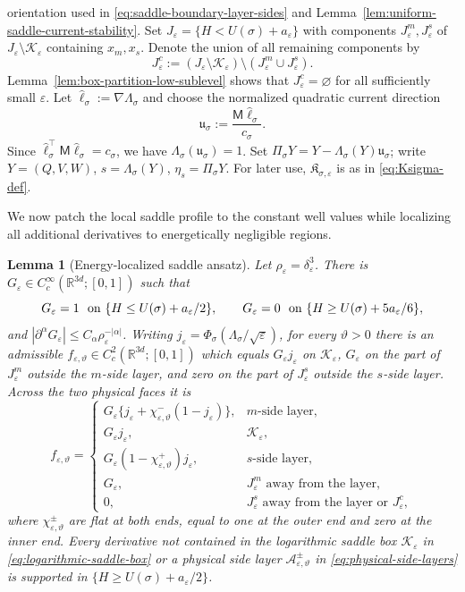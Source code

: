 \documentclass[11pt]{article}
\numberwithin{equation}{section}
\theoremstyle{plain}
\newtheorem{lemma}[theorem]{Lemma}
\theoremstyle{definition}
\theoremstyle{remark}
\newcommand{\R}{\mathbb R}
\newcommand{\eps}{\varepsilon}
\begin{document}
orientation used in \eqref{eq:saddle-boundary-layer-sides} and
Lemma~\ref{lem:uniform-saddle-current-stability}.
Set $J_\eps=\{H<U(\sigma)+a_\eps\}$ with components
$J_\eps^m,J_\eps^s$ of $J_\eps\setminus\mathcal K_\eps$ containing $x_m,x_s$.
Denote the union of all remaining components by
\[
J_\eps^c
:=
\left(J_\eps\setminus\mathcal K_\eps\right)
\setminus\left(J_\eps^m\cup J_\eps^s\right).
\]
Lemma~\ref{lem:box-partition-low-sublevel} shows that
$J_\eps^c=\varnothing$ for all sufficiently small $\eps$.
Let $\widehat\ell_\sigma:=\nabla\Lambda_\sigma$ and choose the normalized quadratic
current direction
\[
\mathfrak u_\sigma:=\frac{\mathsf M\widehat\ell_\sigma}{c_\sigma}.
\]
Since
$\widehat\ell_\sigma^\top\mathsf M\widehat\ell_\sigma=c_\sigma$, we have
$\Lambda_\sigma(\mathfrak u_\sigma)=1$.  Set
$\Pi_\sigma Y=Y-\Lambda_\sigma(Y)\mathfrak u_\sigma$; write
$Y=(Q,V,W)$, $s=\Lambda_\sigma(Y)$, $\eta_s=\Pi_\sigma Y$.  For later use,
$\mathfrak K_{\sigma,\eps}$ is as in \eqref{eq:Ksigma-def}.

We now patch the local saddle profile to the constant well values
while localizing all additional derivatives to energetically negligible
regions.

\begin{lemma}[Energy-localized saddle ansatz]
\label{lem:global-saddle-test-function}
Let $\rho_\eps=\delta_\eps^3$.  There is
$G_\eps\in C_c^\infty(\R^{3d};[0,1])$ such that
\begin{equation}
\label{eq:energy-cutoff-properties}
G_\eps=1\ \hbox{ on }\{H\le U(\sigma)+a_\eps/2\},\qquad
G_\eps=0\ \hbox{ on }\{H\ge U(\sigma)+5a_\eps/6\},
\end{equation}
and $|\partial^\alpha G_\eps|\le C_\alpha\rho_\eps^{-|\alpha|}$.
Writing $j_\eps=\Phi_\sigma(\Lambda_\sigma/\sqrt\eps)$, for every $\vartheta>0$
there is an admissible $f_{\eps,\vartheta}\in C_c^2(\R^{3d};[0,1])$ which equals
$G_\eps j_\eps$ on $\mathcal K_\eps$, $G_\eps$ on the part of $J_\eps^m$
outside the $m$-side layer, and zero on the part of $J_\eps^s$ outside the
$s$-side layer.  Across the two physical faces it is
\begin{equation}
\label{eq:piecewise-energy-saddle-test}
f_{\eps,\vartheta}=
\begin{cases}
G_\eps\{j_\eps+\chi_{\eps,\vartheta}^-(1-j_\eps)\},&m\text{-side layer},\\
G_\eps j_\eps,&\mathcal K_\eps,\\
G_\eps(1-\chi_{\eps,\vartheta}^+)j_\eps,&s\text{-side layer},\\
G_\eps,&J_\eps^m\text{ away from the layer},\\
0,&J_\eps^s\text{ away from the layer or }J_\eps^c,
\end{cases}
\end{equation}
where $\chi_{\eps,\vartheta}^\pm$ are flat at both ends, equal to one at the
outer end and zero at the inner end.
Every derivative not contained in the
logarithmic saddle box $\mathcal K_\eps$ in
\eqref{eq:logarithmic-saddle-box} or a physical side layer
$\mathcal A_{\eps,\vartheta}^\pm$ in \eqref{eq:physical-side-layers} is supported in
$\{H\ge U(\sigma)+a_\eps/2\}$.
\end{lemma}
\end{document}
